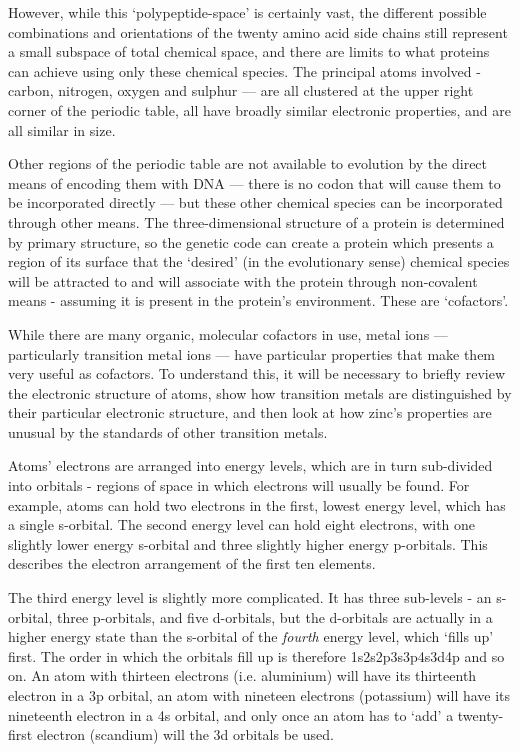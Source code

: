 However, while this `polypeptide-space' is certainly vast, the different possible combinations and orientations of the twenty amino acid side chains still represent a small subspace of total chemical space, and there are limits to what proteins can achieve using only these chemical species. The principal atoms involved - carbon, nitrogen, oxygen and sulphur --- are all clustered at the upper right corner of the periodic table, all have broadly similar electronic properties, and are all similar in size.

Other regions of the periodic table are not available to evolution by the direct means of encoding them with DNA --- there is no codon that will cause them to be incorporated directly --- but these other chemical species can be incorporated through other means. The three-dimensional structure of a protein is determined by primary structure, so the genetic code can create a protein which presents a region of its surface that the `desired' (in the evolutionary sense) chemical species will be attracted to and will associate with the protein through non-covalent means - assuming it is present in the protein's environment. These are `cofactors'.

While there are many organic, molecular cofactors in use, metal ions --- particularly transition metal ions --- have particular properties that make them very useful as cofactors. To understand this, it will be necessary to briefly review the electronic structure of atoms, show how transition metals are distinguished by their particular electronic structure, and then look at how zinc's properties are unusual by the standards of other transition metals.

Atoms' electrons are arranged into energy levels, which are in turn sub-divided into orbitals - regions of space in which electrons will usually be found. For example, atoms can hold two electrons in the first, lowest energy level, which has a single s-orbital. The second energy level can hold eight electrons, with one slightly lower energy s-orbital and three slightly higher energy p-orbitals. This describes the electron arrangement of the first ten elements.

The third energy level is slightly more complicated. It has three sub-levels - an s-orbital, three p-orbitals, and five d-orbitals, but the d-orbitals are actually in a higher energy state than the s-orbital of the \emph{fourth} energy level, which `fills up' first. The order in which the orbitals fill up is therefore 1s2s2p3s3p4s3d4p and so on. An atom with thirteen electrons (i.e. aluminium) will have its thirteenth electron in a 3p orbital, an atom with nineteen electrons (potassium) will have its nineteenth electron in a 4s orbital, and only once an atom has to `add' a twenty-first electron (scandium) will the 3d orbitals be used.

